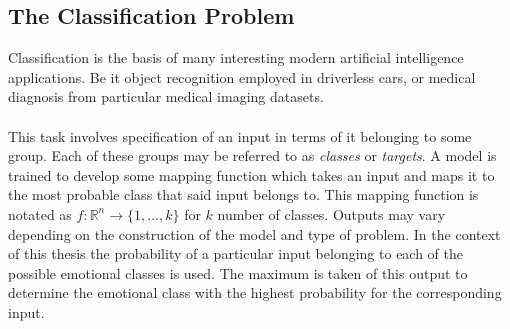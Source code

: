 \subsection{The Classification Problem}
Classification is the basis of many interesting modern artificial intelligence applications. Be it object recognition employed in driverless cars, or medical diagnosis from particular medical imaging datasets.\\ \\
This task involves specification of an input in terms of it belonging to some group. Each of these groups may be referred to as \textit{classes} or \textit{targets}. A model is trained to develop some mapping function which takes an input and maps it to the most probable class that said input belongs to. This mapping function is notated as $f: \mathbb{R}^n \rightarrow \{1, ..., k\}$ for $k$ number of classes. Outputs may vary depending on the construction of the model and type of problem. In the context of this thesis the probability of a particular input belonging to each of the possible emotional classes is used. The maximum is taken of this output to determine the emotional class with the highest probability for the corresponding input.



